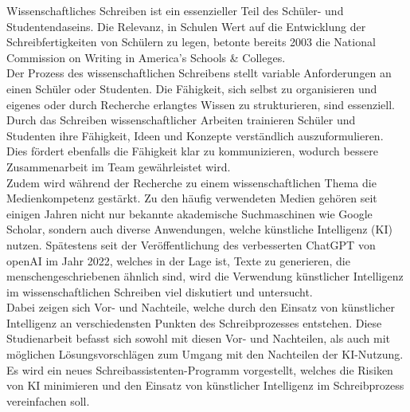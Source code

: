 \documentclass[../main.tex]{subfiles}
\begin{document}
Wissenschaftliches Schreiben ist ein essenzieller Teil des Schüler- und Studentendaseins. 
Die Relevanz, in Schulen Wert auf die Entwicklung der Schreibfertigkeiten von Schülern zu legen, betonte bereits 2003 
die National Commission on Writing in America’s Schools \& Colleges\cite{nationalcommissionwriting}.  \\ Der Prozess des 
wissenschaftlichen Schreibens stellt variable Anforderungen an einen Schüler oder Studenten. Die Fähigkeit, sich selbst zu organisieren und 
eigenes oder durch Recherche erlangtes Wissen zu strukturieren, sind essenziell. Durch das Schreiben 
wissenschaftlicher Arbeiten trainieren Schüler und Studenten ihre Fähigkeit, Ideen und Konzepte verständlich 
auszuformulieren. Dies fördert ebenfalls die Fähigkeit klar zu kommunizieren, wodurch bessere Zusammenarbeit 
im Team gewährleistet wird.\cite{nationalcommissionwriting,teachers,humanWritingToAi} \\ 
Zudem wird während der Recherche zu einem wissenschaftlichen Thema die Medienkompetenz gestärkt. Zu den häufig 
verwendeten Medien gehören seit einigen Jahren nicht nur bekannte akademische Suchmaschinen wie Google Scholar, sondern auch 
diverse Anwendungen, welche künstliche Intelligenz (KI) nutzen. Spätestens seit der Veröffentlichung des verbesserten ChatGPT von openAI im Jahr 2022, welches in der 
Lage ist, Texte zu generieren, die menschengeschriebenen ähnlich sind, wird die Verwendung künstlicher Intelligenz 
im wissenschaftlichen Schreiben viel diskutiert und untersucht.\cite{humanWritingToAi,ZukunftWissenschaftlichesPublizieren}\\
Dabei zeigen sich Vor- und Nachteile, welche durch den Einsatz von künstlicher Intelligenz an verschiedensten Punkten des Schreibprozesses entstehen. 
Diese Studienarbeit befasst sich sowohl mit diesen Vor- und Nachteilen, als auch mit möglichen
Lösungsvorschlägen zum Umgang mit den Nachteilen der KI-Nutzung. Es wird ein neues Schreibassistenten-Programm vorgestellt, welches die Risiken 
von KI minimieren und den Einsatz von künstlicher Intelligenz im Schreibprozess vereinfachen soll.
\end{document}
